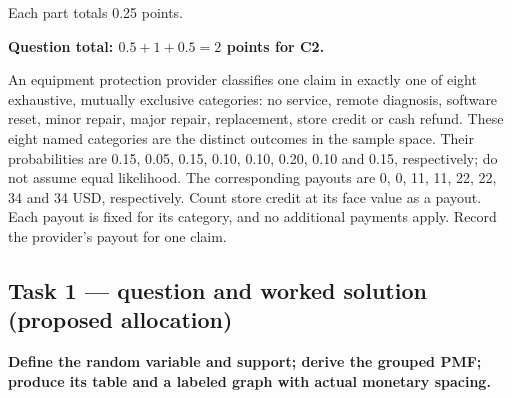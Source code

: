Each part totals 0.25 points.

\par\vspace{3mm}\secInicio[][sec:q3]

\textbf{Question total: $0.5+1+0.5=2$ points for C2.}

\clearpage
{}

An equipment protection provider classifies one claim in exactly one of eight exhaustive, mutually exclusive categories: no service, remote diagnosis, software reset, minor repair, major repair, replacement, store credit or cash refund. These eight named categories are the distinct outcomes in the sample space. Their probabilities are 0.15, 0.05, 0.15, 0.10, 0.10, 0.20, 0.10 and 0.15, respectively; do not assume equal likelihood. The corresponding payouts are 0, 0, 11, 11, 22, 22, 34 and 34 USD, respectively. Count store credit at its face value as a payout. Each payout is fixed for its category, and no additional payments apply. Record the provider's payout for one claim.

\subsection*{Task 1 --- question and worked solution (proposed allocation) }
\label{sol:q4t1}

\noindent\textbf{\boldmath Define the random variable and support; derive the grouped PMF; produce its table and a labeled graph with actual monetary spacing.}\par\nopagebreak

